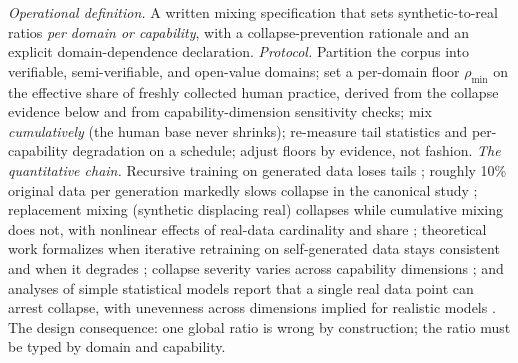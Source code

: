 \documentclass[10pt]{article}
\begin{document}
\emph{Operational definition.} A written mixing specification that sets synthetic-to-real ratios \emph{per domain or capability}, with a collapse-prevention rationale and an explicit domain-dependence declaration. \emph{Protocol.} Partition the corpus into verifiable, semi-verifiable, and open-value domains; set a per-domain floor $\rho_{\min}$ on the effective share of freshly collected human practice, derived from the collapse evidence below and from capability-dimension sensitivity checks; mix \emph{cumulatively} (the human base never shrinks); re-measure tail statistics and per-capability degradation on a schedule; adjust floors by evidence, not fashion. \emph{The quantitative chain.} Recursive training on generated data loses tails \cite{ref4}; roughly 10\% original data per generation markedly slows collapse in the canonical study \cite{ref4}; replacement mixing (synthetic displacing real) collapses while cumulative mixing does not, with nonlinear effects of real-data cardinality and share \cite{ref32}; theoretical work formalizes when iterative retraining on self-generated data stays consistent and when it degrades \cite{ref33}; collapse severity varies across capability dimensions \cite{ref34}; and analyses of simple statistical models report that a single real data point can arrest collapse, with unevenness across dimensions implied for realistic models \cite{ref35}. The design consequence: one global ratio is wrong by construction; the ratio must be typed by domain and capability.
\end{document}
